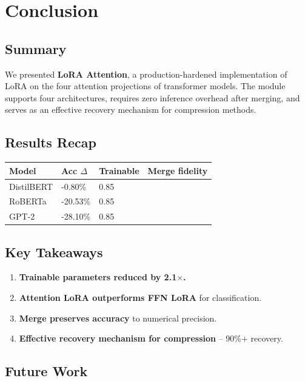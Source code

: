 \section{Conclusion}

\subsection{Summary}

We presented \textbf{LoRA Attention}, a production-hardened implementation of 
LoRA on the four attention projections of transformer models. The module 
supports four architectures, requires zero inference overhead after merging, 
and serves as an effective recovery mechanism for compression methods.

\subsection{Results Recap}

\begin{table}[H]
\centering
\small
\begin{tabular}{llll}
\toprule
\textbf{Model} & \textbf{Acc $\Delta$} & \textbf{Trainable} & \textbf{Merge fidelity} \\
\midrule
DistilBERT & -0.80\% & 0.85 &  \\
RoBERTa & -20.53\% & 0.85 &  \\
GPT-2 & -28.10\% & 0.85 &  \\
\bottomrule
\end{tabular}
\end{table}

\subsection{Key Takeaways}

\begin{enumerate}
\item \textbf{Trainable parameters reduced by 2.1$\times$.}
\item \textbf{Attention LoRA outperforms FFN LoRA} for classification.
\item \textbf{Merge preserves accuracy} to numerical precision.
\item \textbf{Effective recovery mechanism for compression} -- 90\%+ recovery.

\end{enumerate}
\subsection{Future Work}

